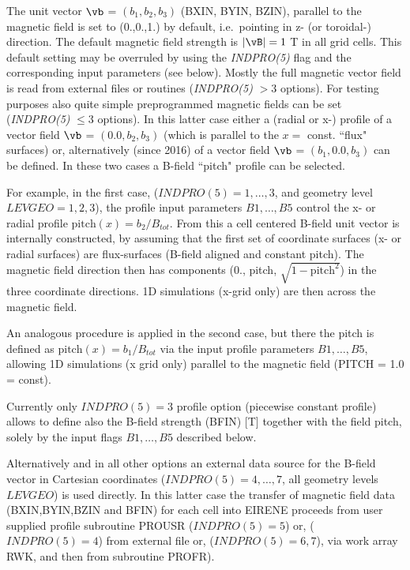 
The unit vector  $\vb$ = $( b_1, b_2, b_3 )$ (BXIN, BYIN, BZIN), parallel to
the magnetic field is set to (0.,0.,1.) by default, i.e.\ pointing in z- (or
toroidal-) direction.
The default magnetic field strength is $|\vB|=1$ T in all grid cells.
This default setting may be overruled by using the \emph{INDPRO(5)} flag and
the corresponding input parameters (see below).
Mostly the full magnetic vector field is read from external files or routines
(\emph{INDPRO(5)} $> 3$ options).
For testing purposes also quite simple preprogrammed magnetic fields can be set
(\emph{INDPRO(5)} $\leq 3$ options).
In this latter case either a (radial or x-) profile of a vector field $\vb$ =
$( 0.0, b_2, b_3 )$ (which is parallel to the $x=$ const.
``flux" surfaces) or, alternatively (since 2016) of a vector field $\vb$ = $(
  b_1, 0.0, b_3 )$ can be defined.
In these two cases a B-field ``pitch"  profile can be selected.

For example, in the first case, ($INDPRO(5) = 1, \dots, 3$, and geometry level
$LEVGEO=1,2,3$), the profile input parameters $B1, \dots, B5$  control the x-
or radial profile $\mathrm{pitch}(x) = b_2/B_{tot}$.
From this a cell centered B-field unit vector is internally constructed, by
assuming that the first set of coordinate surfaces (x- or radial surfaces) are
flux-surfaces (B-field aligned and constant pitch).
The magnetic field direction then has components ($0.
$, pitch, $\sqrt{1-\mathrm{pitch}^2}$) in the three coordinate directions.
1D simulations (x-grid only) are then across the magnetic field.

An analogous procedure is applied in the second case, but there the pitch is
defined as $\mathrm{pitch}(x) = b_1/B_{tot}$ via the input profile parameters
$B1, \dots, B5$, allowing 1D simulations (x grid only) parallel to the magnetic
field (PITCH = 1.0 = const).

Currently only $INDPRO(5)=3$ profile option (piecewise constant profile) allows
to define also the B-field strength (BFIN) [T] together with the field pitch,
solely by the input flags $B1, \dots, B5$ described below.

Alternatively and in all other options an external data source for the B-field
vector in Cartesian coordinates ($INDPRO(5) = 4, \dots, 7$, all geometry levels
$LEVGEO$) is used directly.
In this latter case the transfer of magnetic field data (BXIN,BYIN,BZIN and
BFIN) for each cell into EIRENE proceeds from user supplied profile subroutine
PROUSR ($INDPRO(5)=5$) or, ($INDPRO(5)=4$) from external file or,
($INDPRO(5)=6,7$), via work array RWK, and then from subroutine PROFR).

